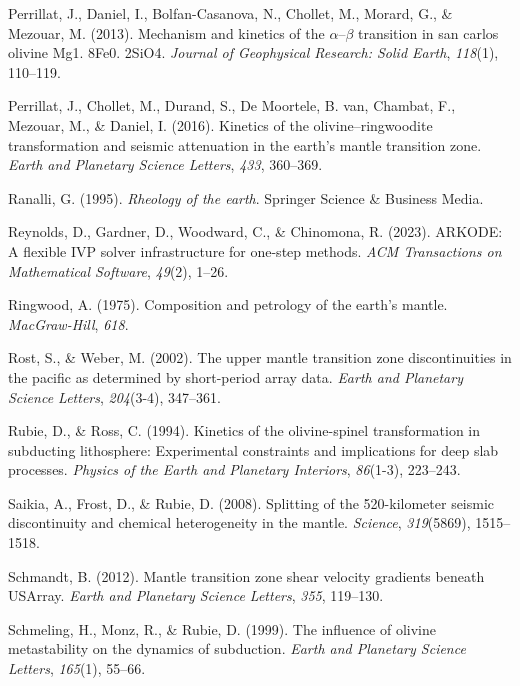 \documentclass[draft,linenumbers]{agujournal2019}
\newlength{\cslhangindent}
\newenvironment{CSLReferences}[2]
 {\begin{list}{}{
  \setlength{\itemindent}{0pt}
  \setlength{\leftmargin}{0pt}
  \setlength{\parsep}{0pt}
  \ifodd #1
   \setlength{\leftmargin}{\cslhangindent}
   \setlength{\itemindent}{-\cslhangindent}
  \fi
  \setlength{\itemsep}{#2\baselineskip}
  }
  \item\relax}
 {\end{list}}
\begin{document}
\begin{CSLReferences}{1}{0}
Perrillat, J., Daniel, I., Bolfan-Casanova, N., Chollet, M., Morard, G.,
\& Mezouar, M. (2013). Mechanism and kinetics of the
\(\alpha\)--\(\beta\) transition in san carlos olivine Mg1. 8Fe0. 2SiO4.
\emph{Journal of Geophysical Research: Solid Earth}, \emph{118}(1),
110--119.

Perrillat, J., Chollet, M., Durand, S., De Moortele, B. van, Chambat,
F., Mezouar, M., \& Daniel, I. (2016). Kinetics of the
olivine--ringwoodite transformation and seismic attenuation in the
earth's mantle transition zone. \emph{Earth and Planetary Science
Letters}, \emph{433}, 360--369.

Ranalli, G. (1995). \emph{Rheology of the earth}. Springer Science \&
Business Media.

Reynolds, D., Gardner, D., Woodward, C., \& Chinomona, R. (2023).
ARKODE: A flexible IVP solver infrastructure for one-step methods.
\emph{ACM Transactions on Mathematical Software}, \emph{49}(2), 1--26.

Ringwood, A. (1975). Composition and petrology of the earth's mantle.
\emph{MacGraw-Hill}, \emph{618}.

Rost, S., \& Weber, M. (2002). The upper mantle transition zone
discontinuities in the pacific as determined by short-period array data.
\emph{Earth and Planetary Science Letters}, \emph{204}(3-4), 347--361.

Rubie, D., \& Ross, C. (1994). Kinetics of the olivine-spinel
transformation in subducting lithosphere: Experimental constraints and
implications for deep slab processes. \emph{Physics of the Earth and
Planetary Interiors}, \emph{86}(1-3), 223--243.

Saikia, A., Frost, D., \& Rubie, D. (2008). Splitting of the
520-kilometer seismic discontinuity and chemical heterogeneity in the
mantle. \emph{Science}, \emph{319}(5869), 1515--1518.

Schmandt, B. (2012). Mantle transition zone shear velocity gradients
beneath USArray. \emph{Earth and Planetary Science Letters}, \emph{355},
119--130.

Schmeling, H., Monz, R., \& Rubie, D. (1999). The influence of olivine
metastability on the dynamics of subduction. \emph{Earth and Planetary
Science Letters}, \emph{165}(1), 55--66.


\end{CSLReferences}
\end{document}
